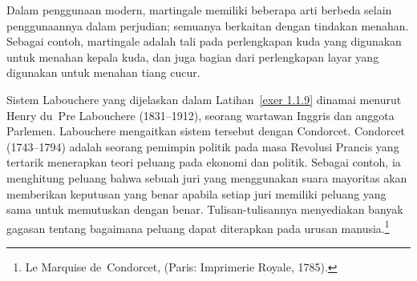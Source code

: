 Dalam penggunaan modern, martingale memiliki beberapa arti berbeda selain penggunaannya dalam perjudian; semuanya berkaitan dengan tindakan \emx
{menahan}.  Sebagai contoh, martingale adalah tali pada
perlengkapan kuda yang digunakan untuk menahan kepala kuda, dan juga bagian dari
perlengkapan layar yang digunakan untuk menahan tiang cucur.

Sistem Labouchere yang dijelaskan dalam Latihan~\ref{exer 1.1.9} 
dinamai menurut Henry du~Pre Labouchere 
(1831--1912), seorang wartawan Inggris dan anggota Parlemen.  La\-bou\-chere mengaitkan 
sistem tersebut dengan Condorcet.  Condorcet (1743--1794) adalah seorang pemimpin 
politik pada masa Revolusi Prancis yang tertarik menerapkan teori peluang 
pada ekonomi dan politik.  Sebagai contoh, ia menghitung peluang bahwa sebuah juri yang menggunakan
suara mayoritas akan memberikan keputusan yang benar apabila setiap juri memiliki peluang yang sama untuk
memutuskan dengan benar.  Tulisan-tulisannya menyediakan banyak gagasan tentang bagaimana
peluang dapat diterapkan pada urusan manusia.\footnote{ Le Marquise de~Condorcet, 
 (Paris: Imprimerie Royale, 1785).}

